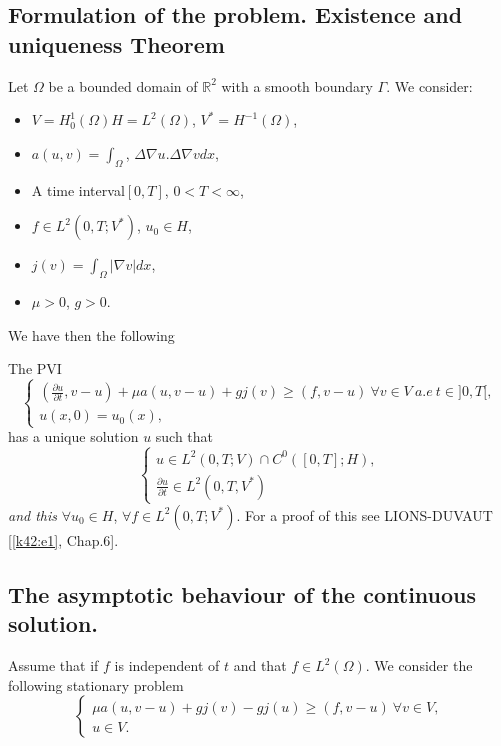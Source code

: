 \subsection{Formulation of the problem. Existence and uniqueness
  Theorem}\label{c3:ss6.1}  

Let $\Omega$ be a bounded domain of $\mathbb{R}^2$ with a smooth
boundary $\Gamma$. We consider:  
\begin{itemize}
\item $V = H^1_0 (\Omega) H = L^2 (\Omega)$, $V^* = H^{-1} (\Omega)$,
\item $a (u,v) = \int_\Omega$, $\Delta \nabla u. \Delta \nabla v dx$,
\item A time interval\pageoriginale  $[0, T]$, $0 < T < \infty$, 
\item $f \in L^2 (0, T; V^*)$, $u_0 \in H$,
\item $j (v) = \int_\Omega |\nabla v| dx$,
\item $\mu > 0$, $g > 0$.
\end{itemize}
We have then the following

\begin{theorem}\label{c3:thm6.1}%
The PVI 
\begin{equation}
\begin{cases}
(\frac{\partial u} {\partial t}, v - u) + \mu a (u, v-u) +gj (v) \geq (f, v-u) 
\ \forall v \in V ~ a.e ~ t \in] 0, T [, \\
u (x, 0) = u_0 (x), \tag{6.1}\label{c3:eq6.1}
\end{cases}
\end{equation}
has a unique solution $u$ such that
\begin{equation*}
\begin{cases}
u \in L^2 (0, T;V) \cap C^0 ([0, T]; H),\\
\frac{\partial u} {\partial t} \in L^2 (0, T, V^*)
\end{cases}
\end{equation*}
{\em and this} $\forall u_0 \in H$, $\forall f \in L^2 (0, T; V^*)$.
For a proof of this see LIONS-DUVAUT [\ref{k42:e1}, Chap.6]. 
\end{theorem}

\subsection{The asymptotic behaviour of the continuous solution.} 

Assume that if $f$ is independent of $t$ and that $f \in L^2
(\Omega)$. We consider the following stationary problem 
\begin{equation}
\begin{cases}
\mu a  (u, v-u) + gj (v) -gj (u) \geq (f, v-u) \ \forall v \in V,\\
u \in V.
\end{cases}\tag{6.2}\label{c3:eq6.2}
\end{equation}

